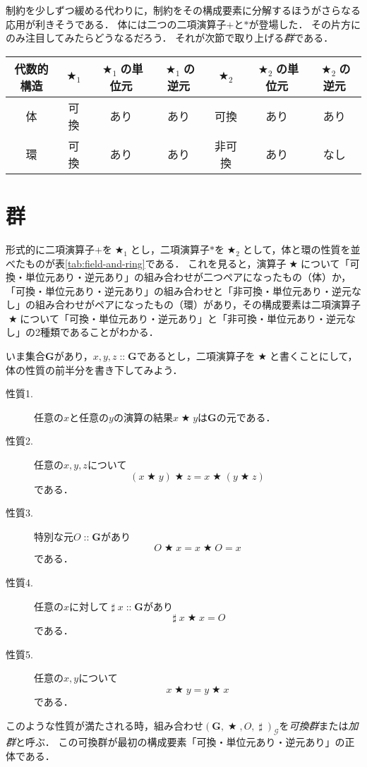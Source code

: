 \documentclass[twocolumn]{jsbook}
\DeclareMathOperator{\mathAnyBinaryOperator}{\bigstar}
\DeclareMathOperator{\mathInverse}{\sharp}
\DeclareMathOperator{\mathIn}{::}
\newcommand{\mathSet}[1]{\mathbf{#1}}
\newcommand{\mathGroup}[4]{(#1,#2,#3,#4)_\mathcal{G}}
\newcommand{\keyword}[1]{\emph{#1}}
\newcommand{\mathsetname}[1]{\boldsymbol{#1}}
\begin{document}
制約を少しずつ緩める代わりに，制約をその構成要素に分解するほうがさらなる応用が利きそうである．
体には二つの二項演算子$+$と$*$が登場した．
その片方にのみ注目してみたらどうなるだろう．
それが次節で取り上げる\keyword{群}である．

\begin{table*}
\caption{代表的な代数的構造の性質(1)}
\label{tab:field-and-ring}
\begin{center}
\begin{tabular}{||c||c|c|c|c|c|c||}
\hline
代数的構造&$\mathAnyBinaryOperator_1$&$\mathAnyBinaryOperator_1$の単位元&$\mathAnyBinaryOperator_1$の逆元&$\mathAnyBinaryOperator_2$&$\mathAnyBinaryOperator_2$の単位元&$\mathAnyBinaryOperator_2$の逆元\\
\hline\hline
体&可換&あり&あり&可換&あり&あり\\
環&可換&あり&あり&非可換&あり&なし\\
\hline
\end{tabular}
\end{center}
\end{table*}

\section{群}

形式的に二項演算子$+$を$\mathAnyBinaryOperator_1$とし，二項演算子$*$を$\mathAnyBinaryOperator_2$として，体と環の性質を並べたものが表\ref{tab:field-and-ring}である．
これを見ると，演算子$\mathAnyBinaryOperator$について「可換・単位元あり・逆元あり」の組み合わせが二つペアになったもの（体）か，「可換・単位元あり・逆元あり」の組み合わせと「非可換・単位元あり・逆元なし」の組み合わせがペアになったもの（環）があり，その構成要素は二項演算子$\mathAnyBinaryOperator$について「可換・単位元あり・逆元あり」と「非可換・単位元あり・逆元なし」の2種類であることがわかる．

いま集合$\mathSet{G}$があり，$x,y,z\mathIn\mathsetname{G}$であるとし，二項演算子を$\mathAnyBinaryOperator$と書くことにして，体の性質の前半分を書き下してみよう．
\begin{description}
\item[性質1.] 任意の$x$と任意の$y$の演算の結果$x\mathAnyBinaryOperator y$は$\mathSet{G}$の元である．
\item[性質2.] 任意の$x,y,z$について$$(x\mathAnyBinaryOperator y)\mathAnyBinaryOperator z=x\mathAnyBinaryOperator(y\mathAnyBinaryOperator z)$$である．
\item[性質3.] 特別な元$O\mathIn\mathSet{G}$があり$$O\mathAnyBinaryOperator x=x\mathAnyBinaryOperator O=x$$である．
\item[性質4.] 任意の$x$に対して$\mathInverse x\mathIn\mathSet{G}$があり$$\mathInverse x\mathAnyBinaryOperator x=O$$である．
\item[性質5.] 任意の$x,y$について$$x\mathAnyBinaryOperator y=y\mathAnyBinaryOperator x$$である．
\end{description}
このような性質が満たされる時，組み合わせ$\mathGroup{\mathSet{G}}{\mathAnyBinaryOperator}{O}{\mathInverse}$を\keyword{可換群}または\keyword{加群}と呼ぶ．
この可換群が最初の構成要素「可換・単位元あり・逆元あり」の正体である．
\end{document}
